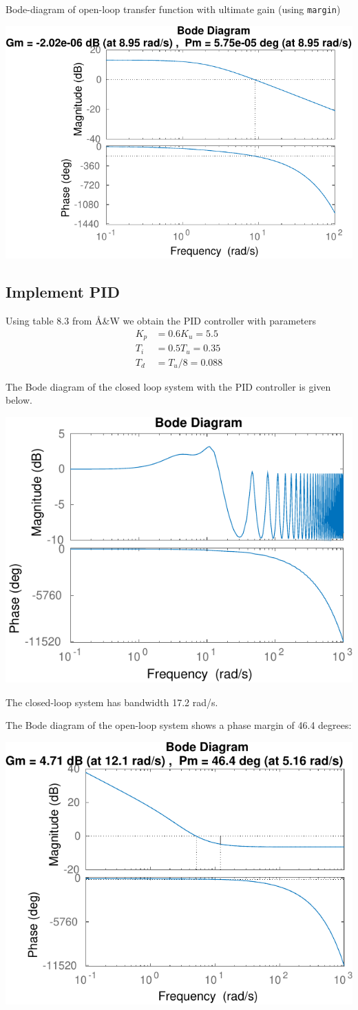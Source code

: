 \documentclass{scrartcl}
\begin{document}
   Bode-diagram of open-loop transfer function with ultimate gain (using \texttt{margin})
      \begin{center}
      \includegraphics[width=0.6\linewidth]{ultimate_margin-crop}
      \end{center}

  
\subsection{Implement PID}
\label{sec-2-3}

   Using table 8.3 from Å\&W we obtain the PID controller with parameters
   \begin{align*}
   K_p &= 0.6 K_u = 5.5\\
   T_i &= 0.5T_u = 0.35\\
   T_d &= T_u/8 = 0.088
   \end{align*}

   The Bode diagram of the closed loop system with the PID controller is given below.
      \begin{center}
      \includegraphics[width=0.6\linewidth]{pid_gc_bode-crop}
      \end{center}
   The closed-loop system has bandwidth 17.2 rad/s.

   The Bode diagram of the open-loop system shows a phase margin of 46.4 degrees:
      \begin{center}
      \includegraphics[width=0.6\linewidth]{pid_go_margin-crop}
      \end{center}
\end{document}
